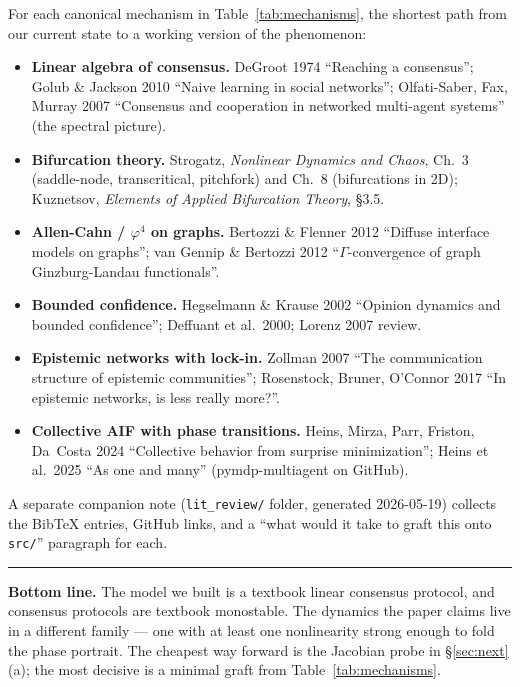 \documentclass[11pt,a4paper]{article}
\theoremstyle{plain}
\begin{document}
For each canonical mechanism in Table~\ref{tab:mechanisms}, the
shortest path from our current state to a working version of the
phenomenon:

\begin{itemize}
\item \textbf{Linear algebra of consensus.} DeGroot 1974
``Reaching a consensus''; Golub \& Jackson 2010 ``Naive learning in
social networks''; Olfati-Saber, Fax, Murray 2007 ``Consensus and
cooperation in networked multi-agent systems'' (the spectral picture).
\item \textbf{Bifurcation theory.} Strogatz, \emph{Nonlinear
Dynamics and Chaos}, Ch.~3 (saddle-node, transcritical, pitchfork)
and Ch.~8 (bifurcations in 2D); Kuznetsov, \emph{Elements of Applied
Bifurcation Theory}, \S3.5.
\item \textbf{Allen-Cahn / $\varphi^4$ on graphs.} Bertozzi \&
Flenner 2012 ``Diffuse interface models on graphs''; van Gennip \&
Bertozzi 2012 ``$\Gamma$-convergence of graph Ginzburg-Landau
functionals''.
\item \textbf{Bounded confidence.} Hegselmann \& Krause 2002
``Opinion dynamics and bounded confidence''; Deffuant et al.\ 2000;
Lorenz 2007 review.
\item \textbf{Epistemic networks with lock-in.} Zollman 2007
``The communication structure of epistemic communities''; Rosenstock,
Bruner, O'Connor 2017 ``In epistemic networks, is less really more?''.
\item \textbf{Collective AIF with phase transitions.} Heins,
Mirza, Parr, Friston, Da~Costa 2024 ``Collective behavior from
surprise minimization''; Heins et al.\ 2025 ``As one and many''
(pymdp-multiagent on GitHub).
\end{itemize}

A separate companion note (\texttt{lit\_review/} folder, generated
2026-05-19) collects the BibTeX entries, GitHub links, and a
``what would it take to graft this onto \texttt{src/}'' paragraph for
each.

\bigskip
\hrule
\bigskip
\noindent\textbf{Bottom line.} The model we built is a textbook
linear consensus protocol, and consensus protocols are textbook
monostable. The dynamics the paper claims live in a different family
--- one with at least one nonlinearity strong enough to fold the
phase portrait. The cheapest way forward is the Jacobian probe in
\S\ref{sec:next}(a); the most decisive is a minimal graft from
Table~\ref{tab:mechanisms}.
\end{document}
